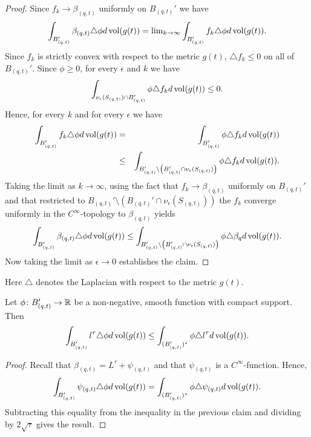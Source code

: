 \begin{proof}\sketch
{}
Since $f_k\rightarrow \beta_{(q,t)}$ uniformly on $B_{(q,t)}'$ we
have
$$\int_{B_{(q,t)}'}\beta_{(q,t)}\triangle \phi d\operatorname{vol}(g(t))=\mathrm{lim}_{k\rightarrow
\infty}\int_{B_{(q,t)}'}f_k\triangle \phi  d\operatorname{vol}(g(t)).$$ Since
$f_k$ is strictly convex with respect to the metric $g(t)$,
$\triangle f_k\le 0$ on all of $B_{(q,t)}'$. Since $\phi\ge 0$, for
every $\epsilon$ and $k$ we have
$$\int_{\nu_\epsilon(S_{(q,t)})\cap B_{(q,t)}'}\phi\triangle f_k  d\operatorname{vol}(g(t))\le
0.$$ Hence, for every $k$ and for every $\epsilon$ we have
\begin{eqnarray*}
\int_{B_{(q,t)}'}f_k\triangle \phi d\operatorname{vol}(g(t)) & = &
\int_{B_{(q,t)}'}\phi\triangle f_k  d\operatorname{vol}(g(t)) \\
& \le & \int_{B_{(q,t)}'\setminus \left(B_{(q,t)}'\cap
\nu_\epsilon(S_{(q,t)})\right)}\phi\triangle f_k d\operatorname{vol}(g(t)).\end{eqnarray*}
 Taking the limit as $k\rightarrow\infty$,
using the fact that $f_k\rightarrow \beta_{(q,t)}$ uniformly on
$B_{(q,t)}'$ and that restricted to
$B_{(q,t)}'\setminus(B_{(q,t)}'\cap \nu_\epsilon (S_{(q,t)}))$ the
$f_k$ converge uniformly in the $C^\infty$-topology to
$\beta_{(q,t)}$ yields
$$\int_{B_{(q,t)}'}\beta_{(q,t)}\triangle \phi d\operatorname{vol}(g(t))
\le \int_{B_{(q,t)}'\setminus \left(B_{(q,t)}'\cap
\nu_\epsilon(S_{(q,t)})\right)}\phi\triangle \beta_q d\operatorname{vol}(g(t)).$$ Now taking the limit as $\epsilon\rightarrow 0$
establishes the claim.
\end{proof}


\begin{remark}
\label{rem:laplacian-convention-metric-gt}

Here $\triangle$ denotes the Laplacian with respect to the metric
$g(t)$.
\end{remark}

\begin{corollary}
\label{cor:l-tau-weak-laplacian-inequality}
\label{ltauineq}
Let $\phi\colon B_{(q,t)}'\to \mathbb{R}$ be a non-negative, smooth
function with compact support. Then
$$\int_{B_{(q,t)}'}l^\tau\triangle \phi d\operatorname{vol}(g(t))\le \int_{(B_{(q,t)}')^*}\phi
\triangle l^\tau d\operatorname{vol}(g(t)).$$
\end{corollary}


\begin{proof}
  \sketch

Recall that $\beta_{(q,t)}=L^\tau+\psi_{(q,t)}$ and that
$\psi_{(q,t)}$ is a $C^\infty$-function. Hence,
$$\int_{B_{(q,t)}'}\psi_{(q,t)}\triangle \phi d\operatorname{vol}(g(t))= \int_{(B_{(q,t)}')^*}\phi
\triangle \psi_{(q,t)} d\operatorname{vol}(g(t)).$$ Subtracting this equality
from the inequality in the previous claim and dividing by
$2\sqrt{\tau}$ gives the result.
\end{proof}

